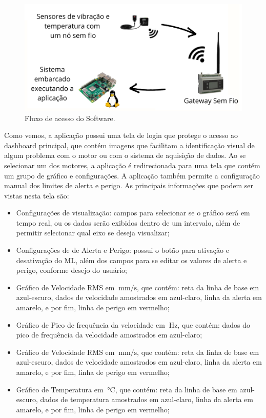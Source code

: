 \begin{figure}[H]
    \caption{Fluxo de acesso do Software.}
    \begin{center}
        \includegraphics[scale=0.8, page=2]{metodologia/img/fluxo_layout.pdf}
    \end{center}
    \label{fig:fluxo_software}
\end{figure}

Como vemos, a aplicação possui uma tela de login que protege o acesso ao dashboard principal, que contém imagens que facilitam a identificação
visual de algum problema com o motor ou com o sistema de aquisição de dados. Ao se selecionar um dos motores, a aplicação é redirecionada para
uma tela que contém um grupo de gráfico e configurações. A aplicação também permite a configuração manual dos limites de alerta e perigo. As 
principais informações que podem ser vistas nesta tela são: 

\begin{itemize}
    \item Configurações de visualização: campos para selecionar se o gráfico será em tempo real, ou os dados serão exibidos dentro de um
intervalo, além de permitir selecionar qual eixo se deseja visualizar;
    \item Configurações de de Alerta e Perigo: possui o botão para ativação e desativação do ML, além dos campos para se editar
os valores de alerta e perigo, conforme desejo do usuário;
    \item Gráfico de Velocidade RMS em $\SI{}{\milli\metre\per\second}$, que contém: reta da linha de base em azul-escuro, dados de velocidade
amostrados em azul-claro, linha da alerta em amarelo, e por fim, linha de perigo em vermelho;
    \item Gráfico de Pico de frequência da velocidade em $\SI{}{\hertz}$, que contém: dados do pico de frequência da velocidade amostrados em 
    azul-claro; 
    \item Gráfico de Velocidade RMS em $\SI{}{\milli\metre\per\second}$, que contém: reta da linha de base em azul-escuro, dados de velocidade
amostrados em azul-claro, linha da alerta em amarelo, e por fim, linha de perigo em vermelho;
    \item Gráfico de Temperatura em $\SI{}{\celsius}$, que contém: reta da linha de base em azul-escuro, dados de temperatura
amostrados em azul-claro, linha da alerta em amarelo, e por fim, linha de perigo em vermelho;
\end{itemize}

